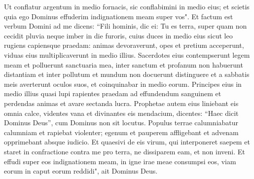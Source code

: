 \begin{biblechapter}
\verse Ut conflatur argentum in medio fornacis, sic conflabimini in medio eius; et scietis quia ego Dominus effuderim indignationem meam super vos". 
\verse Et factum est verbum Domini ad me dicens: 
\verse “Fili hominis, dic ei: Tu es terra, super quam non cecidit pluvia neque imber in die furoris, 
\verse cuius duces in medio eius sicut leo rugiens capiensque praedam: animas devoraverunt, opes et pretium acceperunt, viduas eius multiplicaverunt in medio illius. 
\verse Sacerdotes eius contempserunt legem meam et polluerunt sanctuaria mea, inter sanctum et profanum non habuerunt distantiam et inter pollutum et mundum non docuerunt distinguere et a sabbatis meis averterunt oculos suos, et coinquinabar in medio eorum. 
\verse Principes eius in medio illius quasi lupi rapientes praedam ad effundendum sanguinem et perdendas animas et avare sectanda lucra.  
\verse Prophetae autem eius liniebant eis omnia calce, videntes vana et divinantes eis mendacium, dicentes: “Haec dicit Dominus Deus”, cum Dominus non sit locutus.  
\verse Populus terrae calumniabatur calumniam et rapiebat violenter; egenum et pauperem affligebant et advenam opprimebant absque iudicio. 
\verse Et quaesivi de eis virum, qui interponeret saepem et staret in confractione contra me pro terra, ne dissiparem eam, et non inveni. 
\verse Et effudi super eos indignationem meam, in igne irae meae consumpsi eos, viam eorum in caput eorum reddidi", ait Dominus Deus. 
\end{biblechapter}

